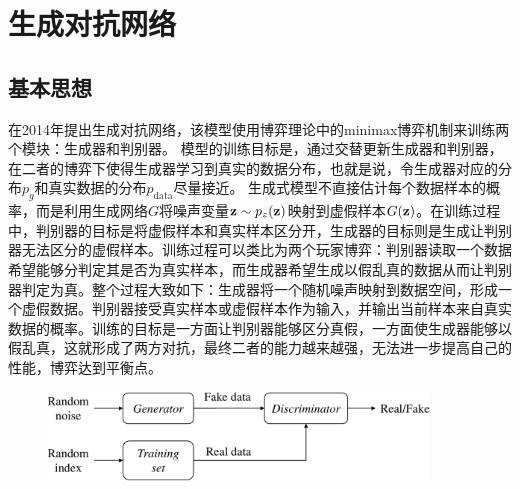 

\section{生成对抗网络}
\subsection{基本思想}
\citet{goodfellow2014generative}在2014年提出生成对抗网络，该模型使用博弈理论中的minimax博弈机制来训练两个模块：生成器和判别器。
模型的训练目标是，通过交替更新生成器和判别器，在二者的博弈下使得生成器学习到真实的数据分布，也就是说，令生成器对应的分布$p_g$和真实数据的分布$p_{\text{data}}$尽量接近。
生成式模型不直接估计每个数据样本的概率，而是利用生成网络$G$将噪声变量$\mathbf{z} \sim p_z(\mathbf{z})$映射到虚假样本$G(\mathbf{z})$。在训练过程中，判别器的目标是将虚假样本和真实样本区分开，生成器的目标则是生成让判别器无法区分的虚假样本。训练过程可以类比为两个玩家博弈：判别器读取一个数据希望能够分判定其是否为真实样本，而生成器希望生成以假乱真的数据从而让判别器判定为真。整个过程大致如下：生成器将一个随机噪声映射到数据空间，形成一个虚假数据。判别器接受真实样本或虚假样本作为输入，并输出当前样本来自真实数据的概率。训练的目标是一方面让判别器能够区分真假，一方面使生成器能够以假乱真，这就形成了两方对抗，最终二者的能力越来越强，无法进一步提高自己的性能，博弈达到平衡点。
\begin{figure}[htbp]
  \centering
  \includegraphics[width=0.9\textwidth]{Img/arch-gan.pdf}
  \label{fig:arch-gan}
\end{figure}

